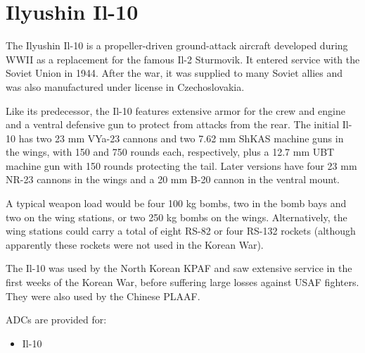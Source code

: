 \section*{Ilyushin Il-10}

The Ilyushin Il-10 is a propeller-driven ground-attack aircraft developed during WWII as a replacement for the famous Il-2 Sturmovik. It entered service with the Soviet Union in 1944. After the war, it was supplied to many Soviet allies and was also manufactured under license in Czechoslovakia.

Like its predecessor, the Il-10 features extensive armor for the crew and engine and a ventral defensive gun to protect from attacks from the rear. The initial Il-10 has two 23 mm VYa-23 cannons and two 7.62 mm ShKAS machine guns in the wings, with 150 and 750 rounds each, respectively, plus a 12.7 mm UBT machine gun with 150 rounds protecting the tail. Later versions have four 23 mm NR-23 cannons in the wings and a 20 mm B-20 cannon in the ventral mount.

A typical weapon load would be four 100 kg bombs, two in the bomb bays and two on the wing stations, or two 250 kg bombs on the wings. Alternatively, the wing stations could carry a total of eight RS-82 or four RS-132 rockets (although apparently these rockets were not used in the Korean War).

The Il-10 was used by the North Korean KPAF and saw extensive service in the first weeks of the Korean War, before suffering large losses against USAF fighters. They were also used by the Chinese PLAAF.

ADCs are provided for:
\begin{itemize}
\item Il-10
\end{itemize}
